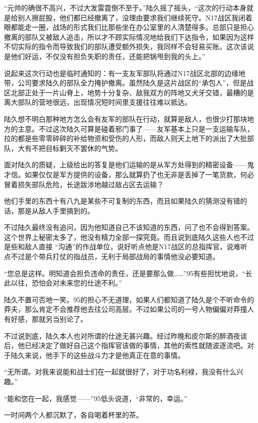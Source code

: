 “元帅的确很不高兴，不过大发雷霆倒不至于。”陆久摇了摇头，“这次的行动本身就是给别人擦屁股，他们都已经撤离了，没理由要求我们继续死守。N17战区我闭着眼都能走一圈，战场的形式我们比那些坐在办公室里的人清楚得多。总部只是担心撤离的部队又被敌人追击，所以才不顾实际情况地给我们下达指令，如果因为这样不切实际的指令而导致我们的部队遭受额外损失，我同样不会轻易买账。这次该说是他们好运，不仅没有担负失职的责任，还能把锅甩到我的头上。”

说起来这次行动也是临时通知的：有一支友军部队将通过N17战区北部的边缘地带，公司要求陆久的部队全力掩护撤离。虽然陆久是这片战区的“承包人”，但是战区北部正处于一片山脊上，地势十分复杂、敌我双方的阵地又犬牙交错，最糟的是离大部队的营地很远，出现情况短时间里支援往往难以抵达。

陆久想不明白那种地方怎么会有友军的部队在行动，就算是敌人，也很少打那块地方的主意。不过这次陆久可算是碰着邪门事了——友军基本上只是一支运输车队，拉的都是些零零碎碎的补给物资和受伤的人形，而敌人则天上地下的派出了大批部队，大有不把目标剿灭不罢休的气势。

面对陆久的质疑，上级给出的答复是他们运输的是从军方处得到的精密设备——鬼才信。如果仅仅是军方提供的设备，那么就算扔了也无非是丢掉了一笔货款，何必冒着损失部队危险，长途跋涉地越过敌占区去运输？

他们手里的东西十有八九是某些不可复制的东西，而且如果陆久的猜测没有错的话，那是从敌人手里搞到的。

不过陆久最终没有追问，因为他知道自己不该知道的东西，问了也不会得到答案。这个世界上秘密太多了，他没有精力全部一探究竟。而且说到底陆久这些人也不过是些和敌人直接 “沟通”的作战单位，说好听点他是N17战区的总指挥官，说难听点不过是个带兵打仗的指战员，无利于局部战局的事情他没必要知道。

“您总是这样。明知道会担负违命的责任，还是要那么做……”95有些担忧地说，“长此以往，恐怕会对未来您的仕途不利。”

陆久不置可否地一笑。95的担心不无道理，如果人们都知道了陆久是个不听命令的莽夫，那么肯定不会推荐他去往公司高层。不过如果公司的一号人物偏偏对莽撞人有好感，那就另当别论了。

不过说到底，陆久本人也对所谓的仕途无甚兴趣。经过昨晚和皮尔斯的醉酒夜谈后，他已经决定了做好自己这个指挥官该做的事情，其他的索性就随波逐流吧。对于陆久来说，他手下的这些战斗力才是他真正在意的事情。

“无所谓。对我来说能和战士们在一起就很好了，对于功名利禄，我没有什么兴趣。”

“能和您在一起，我感觉——”95低头说道，“非常的，幸运。”

一时间两个人都沉默了，各自喝着杯里的茶。

